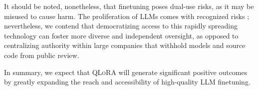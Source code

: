 It should be noted, nonetheless, that finetuning poses dual-use risks, as it may be misused to cause harm. The proliferation of LLMs comes with recognized risks \citep{bommasani2021opportunities,bender2021dangers}; nevertheless, we contend that democratizing access to this rapidly spreading technology can foster more diverse and independent oversight, as opposed to centralizing authority within large companies that withhold models and source code from public review.

In summary, we expect that \textsc{QLoRA} will generate significant positive outcomes by greatly expanding the reach and accessibility of high-quality LLM finetuning.
